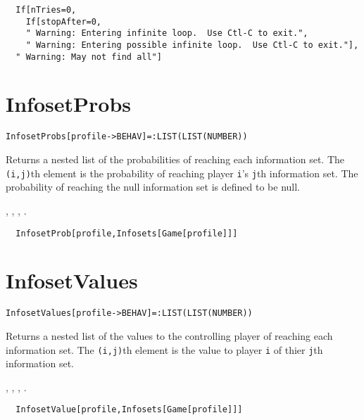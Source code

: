 \udfbody
\begin{verbatim}
  If[nTries=0,
    If[stopAfter=0,
    " Warning: Entering infinite loop.  Use Ctl-C to exit.",  
    " Warning: Entering possible infinite loop.  Use Ctl-C to exit."],
  " Warning: May not find all"]
\end{verbatim} 


\section*{InfosetProbs}\label{ExtInfosetProbs}
\begin{verbatim}
InfosetProbs[profile->BEHAV]=:LIST(LIST(NUMBER))
\end{verbatim}

\noindent
Returns a nested list of the probabilities of reaching each
information set.  The \verb+(i,j)+th element is the probability of
reaching player \verb+i+'s \verb+j+th information set. The probability
of reaching the null information set is defined to be null.  

\seealso
{},
,
,
.

\udfbody
\begin{verbatim}
  InfosetProb[profile,Infosets[Game[profile]]]
\end{verbatim}


\section*{InfosetValues}\label{ExtInfosetValues}
\begin{verbatim}
InfosetValues[profile->BEHAV]=:LIST(LIST(NUMBER))
\end{verbatim}

\noindent
Returns a nested list of the values to the controlling player of
reaching each information set.  The \verb+(i,j)+th element is the
value to player \verb+i+ of thier \verb+j+th information set.  

\seealso
{},
,
,
.

\udfbody
\begin{verbatim}
  InfosetValue[profile,Infosets[Game[profile]]]
\end{verbatim}

